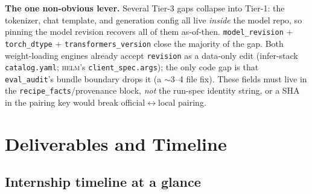 \documentclass[11pt]{report}
\newcommand{\code}[1]{\texttt{#1}}
\begin{document}
\noindent\textbf{The one non-obvious lever.} Several Tier-3 gaps collapse into
Tier-1: the tokenizer, chat template, and generation config all live \emph{inside}
the model repo, so pinning the model revision recovers all of them as-of-then.
\code{model\_revision} + \code{torch\_dtype} + \code{transformers\_version} close
the majority of the gap. Both weight-loading engines already accept \code{revision}
as a data-only edit (infer-stack \code{catalog.yaml}; \textsc{helm}'s
\code{client\_spec.args}); the only code gap is that \code{eval\_audit}'s bundle
boundary drops it (a $\sim$3--4 file fix). These fields must live in the
\code{recipe\_facts}/provenance block, \emph{not} the run-spec identity string, or a
SHA in the pairing key would break official$\leftrightarrow$local pairing.

\chapter{Deliverables and Timeline}
\label{app:deliverables}

\section{Internship timeline at a glance}
\end{document}
